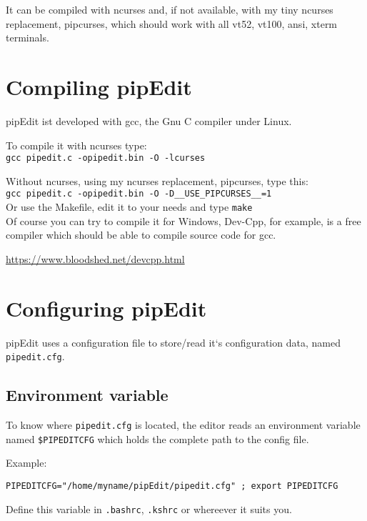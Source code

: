 \documentclass{report}
\begin{document}
It can be compiled with ncurses and, if not available, with my tiny ncurses replacement, pipcurses, which should work with all vt52, vt100, ansi, xterm terminals.



\chapter{Compiling pipEdit}

pipEdit ist developed with gcc, the Gnu C compiler under Linux.

To compile it with ncurses type: \\

\texttt{gcc pipedit.c -opipedit.bin -O -lcurses} \break

Without ncurses, using my ncurses replacement, pipcurses, type this: \\

\texttt{gcc pipedit.c -opipedit.bin -O -D\_\_USE\_PIPCURSES\_\_=1} \\

Or use the Makefile, edit it to your needs and type \texttt{make} \\

Of course you can try to compile it for Windows, Dev-Cpp, for example, is a free compiler which should be able to compile source code for gcc.

\url{https://www.bloodshed.net/devcpp.html}


\chapter{Configuring pipEdit}

pipEdit uses a configuration file to store/read it‘s configuration data, named \texttt{pipedit.cfg}.

\section{Environment variable}

To know where \texttt{pipedit.cfg} is located, the editor reads an environment 
variable named \texttt{\$PIPEDITCFG} which holds the complete path 
to the config file. \\ \break

Example:

\texttt{PIPEDITCFG="/home/myname/pipEdit/pipedit.cfg" ; export PIPEDITCFG} \break

Define this variable in \texttt{.bashrc}, \texttt{.kshrc} 
or whereever it suits you.
\end{document}
